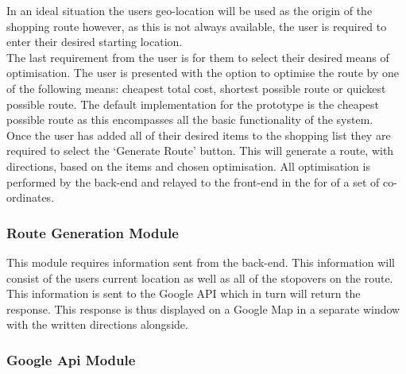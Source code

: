 \documentclass[10pt,twocolumn]{witseiepaper}
\begin{document}
		In an ideal situation the users geo-location will be used as the origin of the shopping route however, as this is not always available, the user is required to enter their desired starting location.\\
		
		The last requirement from the user is for them to select their desired means of optimisation. The user is presented with the option to optimise the route by one of the following means: cheapest total cost, shortest possible route or quickest possible route. The default implementation for the prototype is the cheapest possible route as this encompasses all the basic functionality of the system. \\
		
		Once the user has added all of their desired items to the shopping list they are required to select the `Generate Route' button. This will generate a route, with directions, based on the items and chosen optimisation. All optimisation is performed by the back-end and relayed to the front-end in the for of a set of co-ordinates.
		
		\subsubsection{Route Generation Module}
		
		This module requires information sent from the back-end. This information will consist of the users current location as well as all of the stopovers on the route. This information is sent to the Google API which in turn will return the response. This response is thus displayed on a Google Map in a separate window with the written directions alongside.
		
		\subsubsection{Google Api Module}
		
\end{document}
